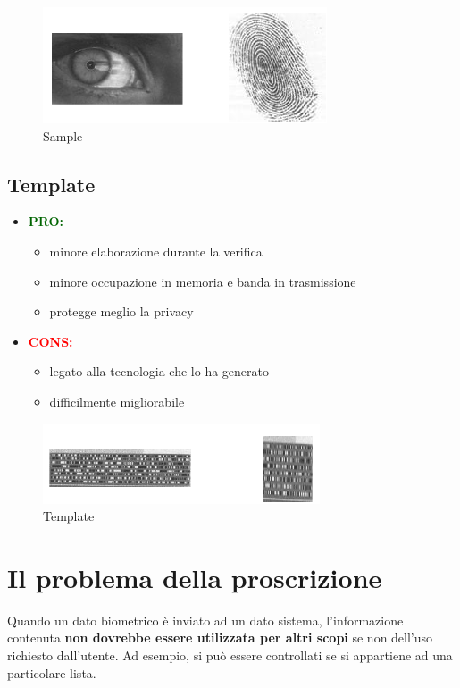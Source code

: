 \documentclass{report}
\begin{document}
\begin{figure}[h]
    \centering
    \includegraphics[width=0.5\linewidth]{images/sample.png}
    \caption{Sample}
    \label{fig:sample}
\end{figure}

\subsection{Template}
\begin{itemize}
    \item \textbf{\textcolor{darkgreen}{PRO:}}
    \begin{itemize}
        \item minore elaborazione durante la verifica
        \item minore occupazione in memoria e banda in trasmissione
        \item protegge meglio la privacy
    \end{itemize}
    \item \textbf{\textcolor{red}{CONS:}}
    \begin{itemize}
        \item legato alla tecnologia che lo ha generato
        \item difficilmente migliorabile
    \end{itemize}
\end{itemize}

\begin{figure}[ht]
    \centering
    \includegraphics[width=0.5\linewidth]{images/template.png}
    \caption{Template}
    \label{fig:template}
\end{figure}

\section{Il problema della proscrizione}

Quando un dato biometrico è inviato ad un dato sistema, l'informazione contenuta \textbf{non dovrebbe essere utilizzata per altri scopi} se non dell'uso richiesto dall'utente.
Ad esempio, si può essere controllati se si appartiene ad una particolare lista.
\end{document}
